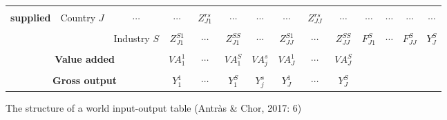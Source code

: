 \documentclass{scrartcl}
\begin{document}
\begin{figure}
{\begin{tabular}{|c|c|c|c|c|c|c|c|c|c|c|c|c|c|}
			\cline{3-14}
			&&&&&&&&&&&&& \\[-8pt]
			\textbf{supplied} & Country $J$ & $\cdots$ & $\cdots$ & $\;Z_{J1}^{rs}\;$ & $\cdots$ & $\cdots$ & $\cdots$ & $\;Z_{JJ}^{rs}\;$ & $\cdots$ & $\cdots$ & $\cdots$ & $\cdots$ & $\cdots$ \\[1pt]
			\cline{3-14} 
			&&&&&&&&&&&&& \\[-8pt]
			&& Industry $S$ & $Z_{J1}^{S1}$ & $\cdots$ & $Z_{J1}^{SS}$ & $\cdots$ & $Z_{JJ}^{S1}$ & $\cdots$ & $Z_{JJ}^{SS}$ & $F^S_{J1}$ & $\cdots$ & $F^S_{JJ}$ & $Y_J^S$ \\[1pt]
			\hline 
			\multicolumn{3}{|c|}{} &&&&&&&& \multicolumn{4}{|c}{} \\[-8pt]
			\multicolumn{3}{|c|}{\textbf{Value added}} & $VA_1^1$ & $\cdots$ & $VA_1^S$ & $VA_j^s$ & $VA_J^1$ & $\cdots$ & $VA_J^S$ & \multicolumn{4}{|c}{} \\[1pt]
			\cline{1-10} 
			\multicolumn{3}{|c|}{} &&&&&&&& \multicolumn{4}{|c}{} \\[-8pt]
			\multicolumn{3}{|c|}{\textbf{Gross output}} & $Y_1^1$ & $\cdots$ & $Y_1^S$ & $Y_j^s$ & $Y_J^1$ & $\cdots$ & $Y_J^S$ & \multicolumn{4}{|c}{} \\[1pt]
			\cline{1-10}
		\end{tabular} 
	}	%
	\caption{The structure of a world input-output table (Antr\`{a}s \& Chor, 2017: 6)}
	\end{figure}
	
\end{document}
